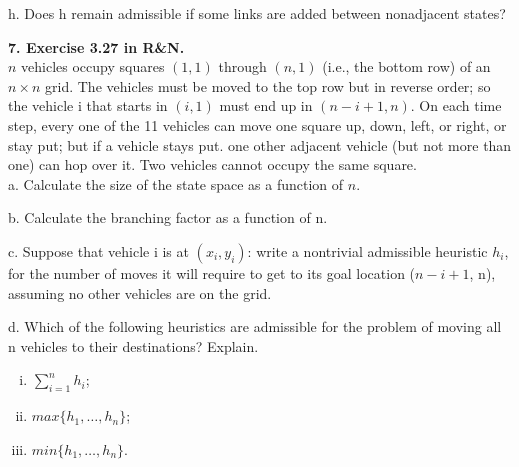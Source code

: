 \documentclass{article}
\begin{document}
h. Does h remain admissible if some links are added between
nonadjacent states? 

\textbf{7. Exercise 3.27 in R\&N.} \\
$n$ vehicles occupy squares $(1, 1)$ through $(n, 1)$ (i.e., the
bottom row) of an $n \times n$ grid.  The vehicles must be moved to
the top row but in reverse order; so the vehicle i that starts in $(i,
1)$ must end up in $(n - i + 1, n)$. On each time step, every one of
the 11 vehicles can move one square up, down, left, or right, or stay
put; but if a vehicle stays put. one other adjacent vehicle (but not
more than one) can hop over it. Two vehicles cannot occupy the same
square. \\
a. Calculate the size of the state space as a function of $n$. 

b. Calculate the branching factor as a function of n. 

c. Suppose that vehicle i is at $(x_i, y_i)$: write a nontrivial
admissible heuristic $h_i$, for the number of moves it will require to
get to its goal location ($n - i + 1$, n), assuming no other vehicles
are on the grid.

d. Which of the following heuristics are admissible for the problem of
moving all n vehicles to their destinations? Explain. 
\begin{enumerate}[(i)]
\item $\sum_{i=1}^nh_i$; 
\item $max\{h_1,\ldots,h_n\}$; 
\item $min\{h_1,\ldots,h_n\}$.
\end{enumerate}
\end{document}
